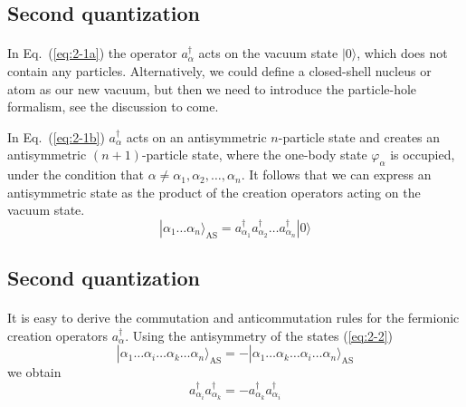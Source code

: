 \documentclass[%
twoside,                 %
final,                   %
10pt]{article}
\begin{document}
\subsection*{Second quantization}

\paragraph{}
In Eq.~(\ref{eq:2-1a}) 
the operator  $a_\alpha^{\dagger}$  acts on the vacuum state 
$|0\rangle$, which does not contain any particles. Alternatively, we could define  a closed-shell nucleus or atom as our new vacuum, but then
we need to introduce the particle-hole  formalism, see the discussion to come. 

In Eq.~(\ref{eq:2-1b}) $a_\alpha^{\dagger}$ acts on an antisymmetric $n$-particle state and 
creates an antisymmetric $(n+1)$-particle state, where the one-body state 
$\varphi_\alpha$ is occupied, under the condition that
$\alpha \ne \alpha_1, \alpha_2, \dots, \alpha_n$. 
It follows that we can express an antisymmetric state as the product of the creation
operators acting on the vacuum state.  
\begin{equation}
	|\alpha_1\dots \alpha_n\rangle_{\mathrm{AS}} = a_{\alpha_1}^{\dagger} a_{\alpha_2}^{\dagger} \dots a_{\alpha_n}^{\dagger} |0\rangle \label{eq:2-2}
\end{equation}



\subsection*{Second quantization}

\paragraph{}
It is easy to derive the commutation and anticommutation rules  for the fermionic creation operators 
$a_\alpha^{\dagger}$. Using the antisymmetry of the states 
(\ref{eq:2-2})
\begin{equation}
	|\alpha_1\dots \alpha_i\dots \alpha_k\dots \alpha_n\rangle_{\mathrm{AS}} = 
		- |\alpha_1\dots \alpha_k\dots \alpha_i\dots \alpha_n\rangle_{\mathrm{AS}} \label{eq:2-3a}
\end{equation}
we obtain
\begin{equation}
	 a_{\alpha_i}^{\dagger}  a_{\alpha_k}^{\dagger} = - a_{\alpha_k}^{\dagger} a_{\alpha_i}^{\dagger} \label{eq:2-3b}
\end{equation}
\end{document}
